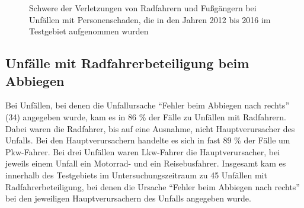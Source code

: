 \begin{savenotes}
	\begin{figure} [H]
		\caption[Schwere der Verletzungen von Radfahrern und Fußgängern bei Unfällen mit Personenschaden, die in den Jahren 2012 bis 2016 im Testgebiet aufgenommen wurden]{Schwere der Verletzungen von Radfahrern und Fußgängern bei Unfällen mit Personenschaden, die in den Jahren 2012 bis 2016 im Testgebiet aufgenommen wurden}\label{fig:Verletzungsschwere_Rad_Fuss} 
	\end{figure}
\end{savenotes}

\subsection{Unfälle mit Radfahrerbeteiligung beim Abbiegen}\label{subsection:Abbiegeunfälle mit Radfahrern}
Bei Unfällen, bei denen die Unfallursache \enquote{Fehler beim Abbiegen nach rechts} (34) angegeben wurde, kam es in 86 \% der Fälle zu Unfällen mit Radfahrern. Dabei waren die Radfahrer, bis auf eine Ausnahme, nicht Hauptverursacher des Unfalls. Bei den Hauptverursachern handelte es sich in fast 89 \% der Fälle um Pkw-Fahrer. Bei drei Unfällen waren Lkw-Fahrer die Hauptverursacher, bei jeweils einem Unfall ein Motorrad- und ein Reisebusfahrer. Insgesamt kam es innerhalb des Testgebiets im Untersuchungszeitraum zu 45 Unfällen mit Radfahrerbeteiligung, bei denen die Ursache \enquote{Fehler beim Abbiegen nach rechts} bei den jeweiligen Hauptverursachern des Unfalls angegeben wurde.

